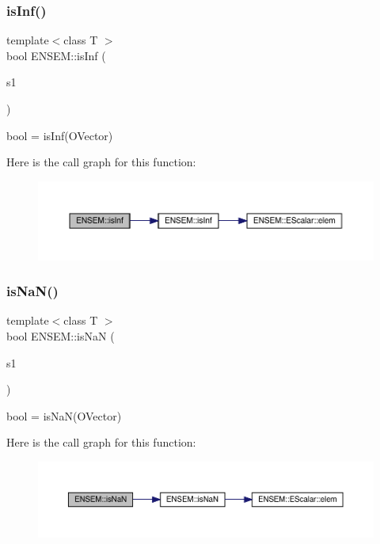 \subsubsection{\texorpdfstring{isInf()}{isInf()}}
{\footnotesize\ttfamily template$<$class T $>$ \\
bool E\+N\+S\+E\+M\+::is\+Inf (\begin{DoxyParamCaption}\item[{const \mbox{\hyperlink{classENSEM_1_1OVector}{O\+Vector}}$<$ T $>$ \&}]{s1 }\end{DoxyParamCaption})}



bool = is\+Inf(\+O\+Vector) 

Here is the call graph for this function\+:\nopagebreak
\begin{figure}[H]
\begin{center}
\leavevmode
\includegraphics[width=350pt]{da/d59/group__obsvector_ga4faba5244cb224511d1944e1cc99b2db_cgraph}
\end{center}
\end{figure}
\mbox{\label{group__obsvector_ga2f554e602e9adc3c7d908a9f9518af6e}} 
\subsubsection{\texorpdfstring{isNaN()}{isNaN()}}
{\footnotesize\ttfamily template$<$class T $>$ \\
bool E\+N\+S\+E\+M\+::is\+NaN (\begin{DoxyParamCaption}\item[{const \mbox{\hyperlink{classENSEM_1_1OVector}{O\+Vector}}$<$ T $>$ \&}]{s1 }\end{DoxyParamCaption})}



bool = is\+Na\+N(\+O\+Vector) 

Here is the call graph for this function\+:\nopagebreak
\begin{figure}[H]
\begin{center}
\leavevmode
\includegraphics[width=350pt]{da/d59/group__obsvector_ga2f554e602e9adc3c7d908a9f9518af6e_cgraph}
\end{center}
\end{figure}
\mbox{\label{group__obsvector_gaba334c166dc76f5d8390574d1ea1a936}} 
